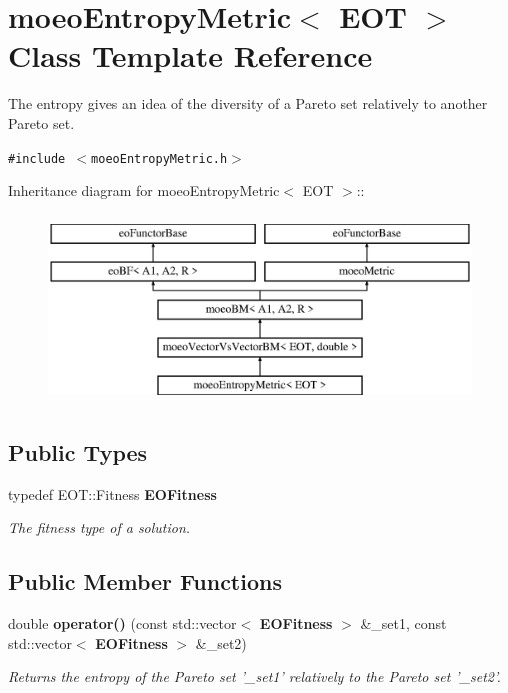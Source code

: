 \section{moeo\-Entropy\-Metric$<$ EOT $>$ Class Template Reference}
\label{classmoeoEntropyMetric}
The entropy gives an idea of the diversity of a Pareto set relatively to another Pareto set.  


{\tt \#include $<$moeo\-Entropy\-Metric.h$>$}

Inheritance diagram for moeo\-Entropy\-Metric$<$ EOT $>$::\begin{figure}[H]
\begin{center}
\leavevmode
\includegraphics[height=5cm]{classmoeoEntropyMetric}
\end{center}
\end{figure}
\subsection*{Public Types}
\begin{CompactItemize}
\item 
typedef EOT::Fitness {\bf EOFitness}\label{classmoeoEntropyMetric_306b72d2236de1ecbae986c65490a8fe}

\begin{CompactList}\small\item\em The fitness type of a solution. \item\end{CompactList}\end{CompactItemize}
\subsection*{Public Member Functions}
\begin{CompactItemize}
\item 
double {\bf operator()} (const std::vector$<$ {\bf EOFitness} $>$ \&\_\-set1, const std::vector$<$ {\bf EOFitness} $>$ \&\_\-set2)
\begin{CompactList}\small\item\em Returns the entropy of the Pareto set '\_\-set1' relatively to the Pareto set '\_\-set2'. \item\end{CompactList}\end{CompactItemize}
